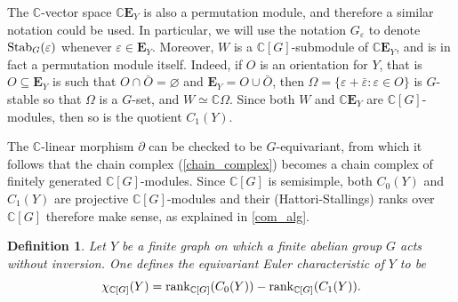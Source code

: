 \documentclass[11pt]{amsart}
\newtheorem{definition}[theorem]{Definition}
\numberwithin{equation}{section}
\theoremstyle{remark}
\theoremstyle{definition}
\begin{document}
The $\mathbb{C}$-vector space $\mathbb{C}\mathbf{E}_{Y}$ is also a permutation module, and therefore a similar notation could be used.  In particular, we will use the notation $G_{\varepsilon}$ to denote ${\rm Stab}_{G}(\varepsilon)$ whenever $\varepsilon \in \mathbf{E}_{Y}$.  Moreover, $W$ is a $\mathbb{C}[G]$-submodule of $\mathbb{C}\mathbf{E}_{Y}$, and is in fact a permutation module itself.  Indeed, if $O$ is an orientation for $Y$, that is $O \subseteq \mathbf{E}_{Y}$ is such that 
$O \cap \bar{O} = \varnothing$ and $\mathbf{E}_{Y} = O \cup \bar{O}$, then $\Omega = \{\varepsilon + \bar{\varepsilon} : \varepsilon \in O\}$ is $G$-stable so that $\Omega$ is a $G$-set, and $W \simeq \mathbb{C}\Omega$.  Since both $W$ and $\mathbb{C}\mathbf{E}_{Y}$ are $\mathbb{C}[G]$-modules, then so is the quotient $C_{1}(Y)$.

The $\mathbb{C}$-linear morphism $\partial$ can be checked to be $G$-equivariant, from which it follows that the chain complex (\ref{chain_complex}) becomes a chain complex of finitely generated $\mathbb{C}[G]$-modules.  Since $\mathbb{C}[G]$ is semisimple, both $C_{0}(Y)$ and $C_{1}(Y)$ are projective $\mathbb{C}[G]$-modules and their (Hattori-Stallings) ranks over $\mathbb{C}[G]$ therefore make sense, as explained in  \cref{com_alg}.

\begin{definition}
Let $Y$ be a finite graph on which a finite abelian group $G$ acts without inversion.  One defines the equivariant Euler characteristic of $Y$ to be
$$\chi_{\mathbb{C}[G]}(Y) = {\rm rank}_{\mathbb{C}[G]} (C_{0}(Y)) - {\rm rank}_{\mathbb{C}[G]} (C_{1}(Y)).$$
\end{definition}
\end{document}
